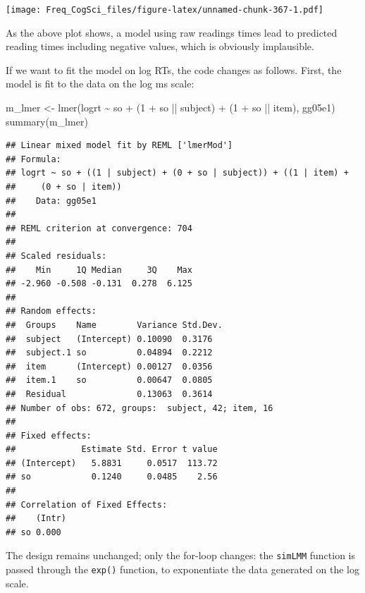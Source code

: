 \documentclass[
  12pt,
]{krantz}
\newenvironment{Shaded}{\begin{snugshade}}{\end{snugshade}}
\newcommand{\DecValTok}[1]{\textcolor[rgb]{0.00,0.00,0.81}{#1}}
\newcommand{\FunctionTok}[1]{\textcolor[rgb]{0.00,0.00,0.00}{#1}}
\newcommand{\NormalTok}[1]{#1}
\newcommand{\OtherTok}[1]{\textcolor[rgb]{0.56,0.35,0.01}{#1}}
\newcommand{\SpecialCharTok}[1]{\textcolor[rgb]{0.00,0.00,0.00}{#1}}
\theoremstyle{definition}
\theoremstyle{definition}
\theoremstyle{definition}
\theoremstyle{definition}
\theoremstyle{remark}
\begin{document}
\texttt{[image: Freq\_CogSci\_files/figure-latex/unnamed-chunk-367-1.pdf]}

As the above plot shows, a model using raw readings times lead to predicted reading times including negative values, which is obviously implausible.

If we want to fit the model on log RTs, the code changes as follows.
First, the model is fit to the data on the log ms scale:

\begin{Shaded}
\begin{Highlighting}[]
\NormalTok{m\_lmer }\OtherTok{\textless{}{-}} \FunctionTok{lmer}\NormalTok{(logrt }\SpecialCharTok{\textasciitilde{}}\NormalTok{ so }\SpecialCharTok{+}\NormalTok{ (}\DecValTok{1} \SpecialCharTok{+}\NormalTok{ so }\SpecialCharTok{||}\NormalTok{ subject) }\SpecialCharTok{+}\NormalTok{ (}\DecValTok{1} \SpecialCharTok{+}\NormalTok{ so }\SpecialCharTok{||}\NormalTok{ item), gg05e1)}
\FunctionTok{summary}\NormalTok{(m\_lmer)}
\end{Highlighting}
\end{Shaded}

\begin{verbatim}
## Linear mixed model fit by REML ['lmerMod']
## Formula: 
## logrt ~ so + ((1 | subject) + (0 + so | subject)) + ((1 | item) +  
##     (0 + so | item))
##    Data: gg05e1
## 
## REML criterion at convergence: 704
## 
## Scaled residuals: 
##    Min     1Q Median     3Q    Max 
## -2.960 -0.508 -0.131  0.278  6.125 
## 
## Random effects:
##  Groups    Name        Variance Std.Dev.
##  subject   (Intercept) 0.10090  0.3176  
##  subject.1 so          0.04894  0.2212  
##  item      (Intercept) 0.00127  0.0356  
##  item.1    so          0.00647  0.0805  
##  Residual              0.13063  0.3614  
## Number of obs: 672, groups:  subject, 42; item, 16
## 
## Fixed effects:
##             Estimate Std. Error t value
## (Intercept)   5.8831     0.0517  113.72
## so            0.1240     0.0485    2.56
## 
## Correlation of Fixed Effects:
##    (Intr)
## so 0.000
\end{verbatim}

The design remains unchanged; only the for-loop changes: the \texttt{simLMM} function is passed through the \texttt{exp()} function, to exponentiate the data generated on the log scale.
\end{document}
